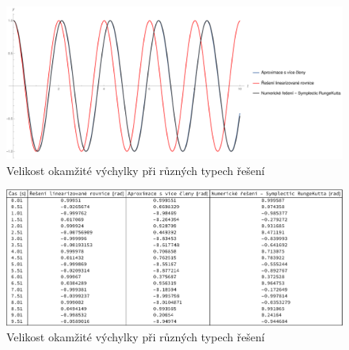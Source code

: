 \begin{figure}[h]
  \centering
  \includegraphics[width=17cm]{figures/ZAVER1.pdf}
  \caption{Velikost okamžité výchylky při různých typech řešení}
  \label{fig:zav1}
\end{figure}

\begin{figure}[h]
  \centering
  \includegraphics[width=17cm]{figures/ZAVER1-TAB.pdf}
  \caption{Velikost okamžité výchylky při různých typech řešení}
  \label{fig:zav2}
\end{figure}


